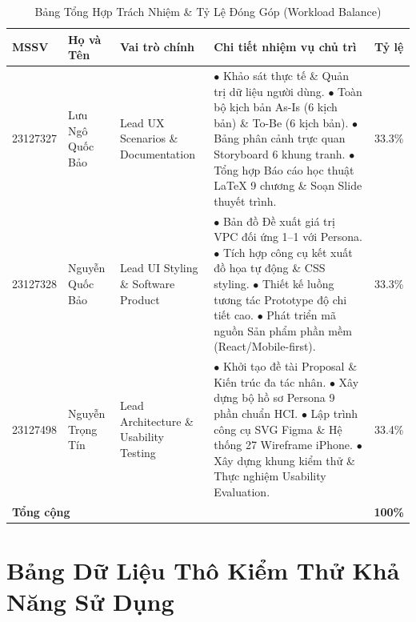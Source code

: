 \begin{table}[H]
  \centering
  \footnotesize
  \renewcommand{\arraystretch}{1.12}
  \begin{tabularx}{\textwidth}{|l|l|m{3.0cm}|X|c|}
    \hline
    \textbf{MSSV} & \textbf{Họ và Tên} & \textbf{Vai trò chính} & \textbf{Chi tiết nhiệm vụ chủ trì} & \textbf{Tỷ lệ} \\ \hline
    23127327 & Lưu Ngô Quốc Bảo & Lead UX Scenarios \& Documentation &
    $\bullet$ Khảo sát thực tế \& Quản trị dữ liệu người dùng. \newline
    $\bullet$ Toàn bộ kịch bản As-Is (6 kịch bản) \& To-Be (6 kịch bản). \newline
    $\bullet$ Bảng phân cảnh trực quan Storyboard 6 khung tranh. \newline
    $\bullet$ Tổng hợp Báo cáo học thuật \LaTeX{} 9 chương \& Soạn Slide thuyết trình.
    & 33.3\% \\ \hline
    23127328 & Nguyễn Quốc Bảo & Lead UI Styling \& Software Product &
    $\bullet$ Bản đồ Đề xuất giá trị VPC đối ứng 1--1 với Persona. \newline
    $\bullet$ Tích hợp công cụ kết xuất đồ họa tự động \& CSS styling. \newline
    $\bullet$ Thiết kế luồng tương tác Prototype độ chi tiết cao. \newline
    $\bullet$ Phát triển mã nguồn Sản phẩm phần mềm (React/Mobile-first).
    & 33.3\% \\ \hline
    23127498 & Nguyễn Trọng Tín & Lead Architecture \& Usability Testing &
    $\bullet$ Khởi tạo đề tài Proposal \& Kiến trúc đa tác nhân. \newline
    $\bullet$ Xây dựng bộ hồ sơ Persona 9 phần chuẩn HCI. \newline
    $\bullet$ Lập trình công cụ SVG Figma \& Hệ thống 27 Wireframe iPhone. \newline
    $\bullet$ Xây dựng khung kiểm thử \& Thực nghiệm Usability Evaluation.
    & 33.4\% \\ \hline
    \multicolumn{4}{|l|}{\textbf{Tổng cộng}} & \textbf{100\%} \\ \hline
  \end{tabularx}
  \caption{Bảng Tổng Hợp Trách Nhiệm \& Tỷ Lệ Đóng Góp (Workload Balance)}
  \label{tab:workload_balance_matrix}
\end{table}

\newpage
\section{Bảng Dữ Liệu Thô Kiểm Thử Khả Năng Sử Dụng}

